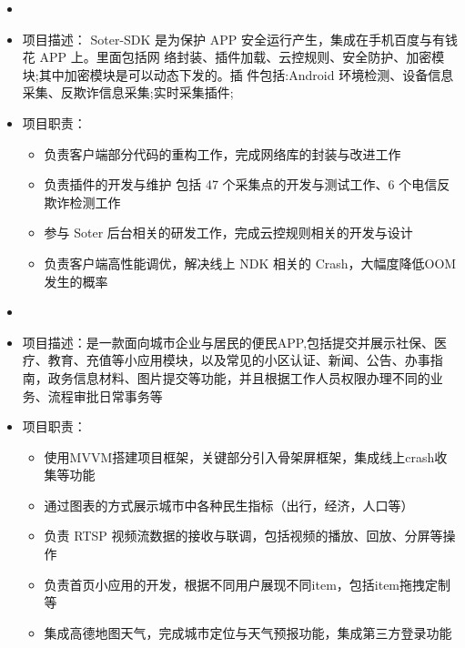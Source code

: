 \begin{itemize}[leftmargin=*]
  \item
    \item 项目描述： Soter-SDK 是为保护 APP 安全运行产生，集成在手机百度与有钱花 APP 上。里面包括网 络封装、插件加载、云控规则、安全防护、加密模块;其中加密模块是可以动态下发的。插 件包括:Android 环境检测、设备信息采集、反欺诈信息采集;实时采集插件;  
    \item 项目职责：
    {\small
    \begin{itemize}
      \item 负责客户端部分代码的重构工作，完成网络库的封装与改进工作
      \item 负责插件的开发与维护 包括 47 个采集点的开发与测试工作、6 个电信反欺诈检测工作
      \item 参与 Soter 后台相关的研发工作，完成云控规则相关的开发与设计
      \item 负责客户端高性能调优，解决线上 NDK 相关的 Crash，大幅度降低OOM发生的概率
    \end{itemize}
    }

    
  \item
    \item 项目描述：是一款面向城市企业与居民的便民APP,包括提交并展示社保、医疗、教育、充值等小应用模块，以及常见的小区认证、新闻、公告、办事指南，政务信息材料、图片提交等功能，并且根据工作人员权限办理不同的业务、流程审批日常事务等
    \item 项目职责：
    {\small
    \begin{itemize}
      \item 使用MVVM搭建项目框架，关键部分引入骨架屏框架，集成线上crash收集等功能
      \item 通过图表的方式展示城市中各种民生指标（出行，经济，人口等）
      \item 负责 RTSP 视频流数据的接收与联调，包括视频的播放、回放、分屏等操作
      \item 负责首页小应用的开发，根据不同用户展现不同item，包括item拖拽定制等
      \item 集成高德地图天气，完成城市定位与天气预报功能，集成第三方登录功能
    \end{itemize}
    }
  \end{itemize}
